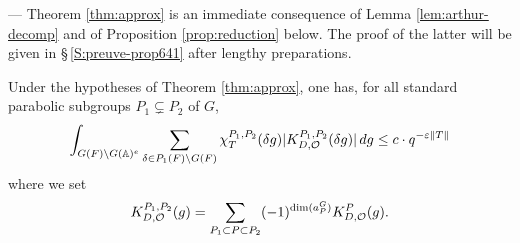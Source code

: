 \begin{paragr} --- \label{S:reduction} Theorem \ref{thm:approx} is an immediate consequence of Lemma \ref{lem:arthur-decomp} and of Proposition \ref{prop:reduction} below. The proof of the latter will be given in \S\,\ref{S:preuve-prop641} after lengthy preparations.

\begin{proposition}\label{prop:reduction}
  Under the hypotheses of Theorem \ref{thm:approx}, one has, for all standard parabolic subgroups $P_1\subsetneq P_2$ of $G$,
$$\int_{G(F)\backslash G(\mathbb{A})^e} \sum_{\delta\in P_1(F)\backslash G(F)} \chi_T^{P_1,P_2}(\delta g)|K^{P_1,P_2}_{D,\mathcal{O}}(\delta g)|\, dg\leq c\cdot q^{-\varepsilon\|T\|}$$
where we set
\begin{equation}
  \label{eq:KP1P2}
  K^{P_1,P_2}_{D,\mathcal{O}}(g)=\sum_{P_1\subset P\subset P_2} (-1)^{\dim(a_P^G)} K^P_{D,\mathcal{O}}(g).
\end{equation}
\end{proposition}
\end{paragr}

